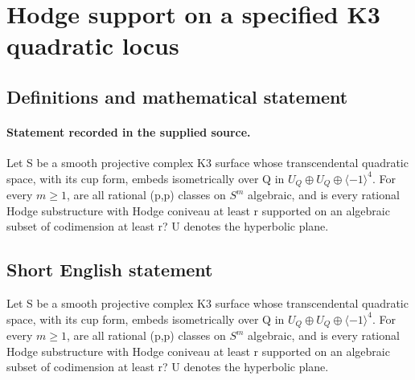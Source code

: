 \documentclass[11pt]{article}
\begin{document}
\section*{Hodge support on a specified K3 quadratic locus}\label{30007033}
\subsection{Definitions and mathematical statement}
\paragraph{Statement recorded in the supplied source.}
Let S be a smooth projective complex K3 surface whose transcendental quadratic space, with its cup form, embeds isometrically over Q in $U_Q\oplus U_Q\oplus \langle -1\rangle ^{4}$. For every $m\geq 1$, are all rational (p,p) classes on $S^m$ algebraic, and is every rational Hodge substructure with Hodge coniveau at least r supported on an algebraic subset of codimension at least r? U denotes the hyperbolic plane.
\subsection{Short English statement}
Let S be a smooth projective complex K3 surface whose transcendental quadratic space, with its cup form, embeds isometrically over Q in $U_Q\oplus U_Q\oplus \langle -1\rangle ^{4}$. For every $m\geq 1$, are all rational (p,p) classes on $S^m$ algebraic, and is every rational Hodge substructure with Hodge coniveau at least r supported on an algebraic subset of codimension at least r? U denotes the hyperbolic plane.
\end{document}

